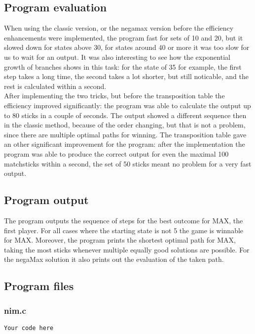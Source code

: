 \documentclass{article}
\begin{document}
\subsection*{Program evaluation}
When using the classic version, or the negamax version before the efficiency enhancements were implemented, the program fast for sets of 10 and 20, but it slowed down for states above 30, for states around 40 or more it was too slow for us to wait for an output. It was also interesting to see how the exponential growth of branches shows in this task: for the state of 35 for example, the first step takes a long time, the second takes a lot shorter, but still noticable, and the rest is calculated within a second.\\
After implementing the two tricks, but before the transposition table the efficiency improved significantly: the program was able to calculate the output up to 80 sticks in a couple of seconds. The output showed a different sequence then in the classic method, because of the order changing, but that is not a problem, since there are multiple optimal paths for winning.
The transposition table gave an other significant improvement for the program: after the implementation the program was able to produce the correct output for even the maximal 100 matchsticks within a second, the set of 50 sticks meant no problem for a very fast output.

\subsection*{Program output}
The program outputs the sequence of steps for the best outcome for MAX, the first player. For all cases where the starting state is not 5 the game is winnable for MAX. Moreover, the program prints the shortest optimal path for MAX, taking the most sticks whenever multiple equally good solutions are possible. For the negaMax solution it also prints out the evaluation of the taken path.

\subsection*{Program files}
\subsubsection*{nim.c}
\begin{lstlisting}
Your code here
\end{lstlisting}
\end{document}
